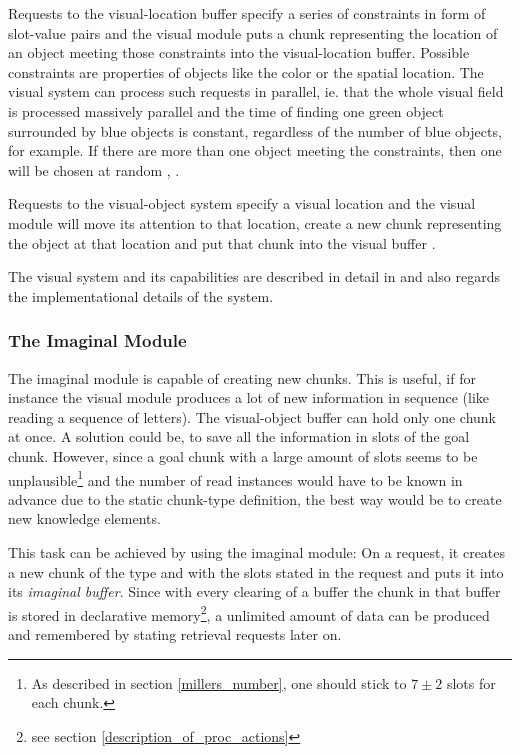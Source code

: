 Requests to the visual-location buffer specify a series of constraints in form of slot-value pairs and the visual module puts a chunk representing the location of an object meeting those constraints into the visual-location buffer. Possible constraints are properties of objects like the color or the spatial location. The visual system can process such requests in parallel, ie. that the whole visual field is processed massively parallel and the time of finding one green object surrounded by blue objects is constant, regardless of the number of blue objects, for example. If there are more than one object meeting the constraints, then one will be chosen at random \cite[p. 1039]{anderson_integrated_2004}, \cite[p. 68]{anderson_how_2007}.

Requests to the visual-object system specify a visual location and the visual module will move its attention to that location, create a new chunk representing the object at that location and put that chunk into the visual buffer \cite[unit 2, chapter 2.5.3]{actr_tutorial}.

The visual system and its capabilities are described in detail in \cite[unit 2]{actr_tutorial} and also regards the implementational details of the system.

\subsubsection{The Imaginal Module}

The imaginal module is capable of creating new chunks. This is useful, if for instance the visual module produces a lot of new information in sequence (like reading a sequence of letters). The visual-object buffer can hold only one chunk at once. A solution could be, to save all the information in slots of the goal chunk. However, since a goal chunk with a large amount of slots seems to be unplausible\footnote{As described in section \ref{millers_number}, one should stick to $7 \pm 2$ slots for each chunk.} and the number of read instances would have to be known in advance due to the static chunk-type definition, the best way would be to create new knowledge elements.

This task can be achieved by using the imaginal module: On a request, it creates a new chunk of the type and with the slots stated in the request and puts it into its \emph{imaginal buffer}. Since with every clearing of a buffer the chunk in that buffer is stored in declarative memory\footnote{see section \ref{description_of_proc_actions}}, a unlimited amount of data can be produced and remembered by stating retrieval requests later on.

